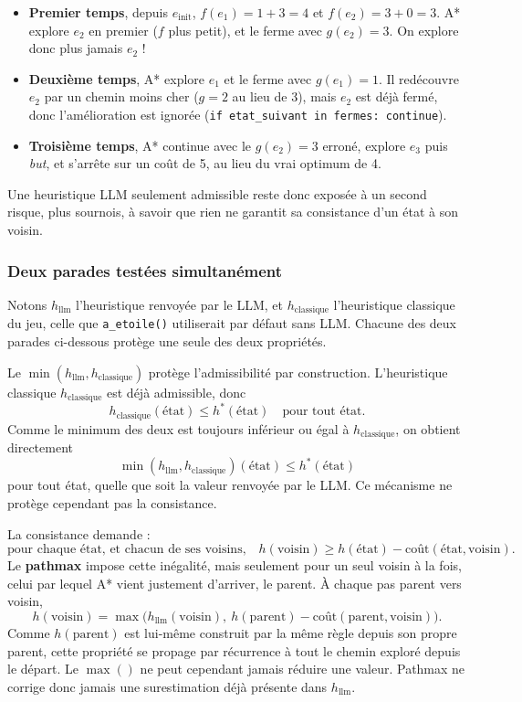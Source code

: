 \documentclass[11pt,a4paper]{article}
\begin{document}
\begin{itemize}
    \item \textbf{Premier temps}, depuis $e_{\text{init}}$, $f(e_1)=1+3=4$
    et $f(e_2)=3+0=3$. A* explore $e_2$ en premier ($f$ plus petit), et le
    ferme avec $g(e_2)=3$. On explore donc plus jamais $e_2$ !
    
    \item \textbf{Deuxième temps}, A* explore $e_1$ et le ferme avec
    $g(e_1)=1$. Il redécouvre $e_2$ par un chemin moins cher ($g=2$ au
    lieu de 3), mais $e_2$ est déjà fermé, donc l'amélioration est
    ignorée (\texttt{if etat\_suivant in fermes: continue}).
    \item \textbf{Troisième temps}, A* continue avec le $g(e_2)=3$
    erroné, explore $e_3$ puis \emph{but}, et s'arrête sur un coût de 5,
    au lieu du vrai optimum de 4.
\end{itemize}

Une heuristique LLM seulement admissible reste donc exposée à un second risque, plus sournois, à savoir que rien ne garantit sa consistance d'un état à son voisin.

\subsubsection*{Deux parades testées simultanément}

Notons $h_{\text{llm}}$ l'heuristique renvoyée par le LLM, et
$h_{\text{classique}}$ l'heuristique classique du jeu, celle que
\texttt{a\_etoile()} utiliserait par défaut sans LLM. Chacune des deux parades ci-dessous protège une seule des deux propriétés.

\medskip
\noindent
Le \textbf{$\min(h_{\text{llm}}, h_{\text{classique}})$} protège l'admissibilité par construction. L'heuristique classique $h_{\text{classique}}$ est déjà admissible, donc
\[
h_{\text{classique}}(\text{état}) \le h^*(\text{état}) \quad \text{pour tout état.}
\]
Comme le minimum des deux est toujours inférieur ou égal à $h_{\text{classique}}$, on obtient directement
\[
\min(h_{\text{llm}}, h_{\text{classique}})(\text{état}) \le h^*(\text{état})
\]
pour tout état, quelle que soit la valeur renvoyée par le LLM. Ce mécanisme ne protège cependant pas la consistance.

\medskip
\noindent
La consistance demande :
\[
\text{pour chaque état, et chacun de ses voisins,} \quad h(\text{voisin}) \ge h(\text{état}) - \text{coût}(\text{état}, \text{voisin}).
\]
Le \textbf{pathmax} impose cette inégalité, mais seulement pour un seul
voisin à la fois, celui par lequel A* vient justement d'arriver, le
parent. À chaque pas parent vers voisin,
\[
h(\text{voisin}) = \max\big(h_{\text{llm}}(\text{voisin}),\ h(\text{parent}) - \text{coût}(\text{parent},\text{voisin})\big).
\]
Comme $h(\text{parent})$ est lui-même construit par la même règle depuis son propre parent, cette propriété se propage par récurrence à tout le chemin exploré depuis le départ. Le $\max()$ ne peut cependant jamais réduire une valeur. Pathmax ne corrige donc jamais une surestimation déjà présente dans $h_{\text{llm}}$.
\end{document}
